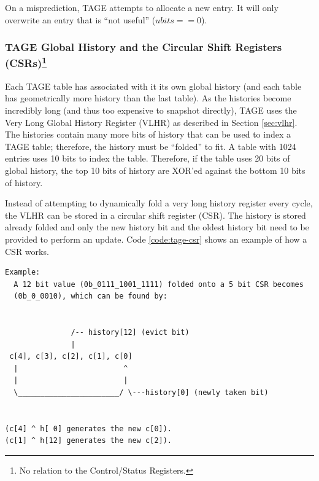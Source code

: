 On a misprediction, TAGE attempts to allocate a new entry. It will only overwrite an entry that is ``not useful'' ($ubits == 0$). 

\subsubsection{TAGE Global History and the Circular Shift Registers (CSRs)\footnote{No relation to the Control/Status Registers.}}

Each TAGE table has associated with it its own global history (and each table has geometrically more history than the last table). As the histories become incredibly long (and thus too expensive to snapshot directly), TAGE uses the Very Long Global History Register (VLHR) as described in Section \ref{sec:vlhr}.  The histories contain many more bits of history that can be used to index a TAGE table; therefore, the history must be ``folded'' to fit. A table with 1024 entries uses 10 bits to index the table. Therefore, if the table uses 20 bits of global history, the top 10 bits of history are XOR'ed against the bottom 10 bits of history. 

Instead of attempting to dynamically fold a very long history register every cycle, the VLHR can be stored in a circular shift register (CSR).  The history is stored already folded and only the new history bit and the oldest history bit need to be provided to perform an update. Code \ref{code:tage-csr} shows an example of how a CSR works. 

\begin{center}
\begin{minipage}{0.90\textwidth}
\begin{lstlisting}[caption={The circular shift register. When a new branch outcome is added, the register is shifted (and wrapped around). The new outcome is added and the oldest bit in the history is ``evicted''.}]
Example:   
  A 12 bit value (0b_0111_1001_1111) folded onto a 5 bit CSR becomes 
  (0b_0_0010), which can be found by:                                       
                                                                             
                                                                             
               /-- history[12] (evict bit)                                   
               |                                                             
 c[4], c[3], c[2], c[1], c[0]                                                
  |                        ^                                                 
  |                        |                                                 
  \_______________________/ \---history[0] (newly taken bit)                 
                                                                             
                                                                             
(c[4] ^ h[ 0] generates the new c[0]).                                        
(c[1] ^ h[12] generates the new c[2]).       
\end{lstlisting}\label{code:tage-csr}
\end{minipage}
\end{center}                                 


